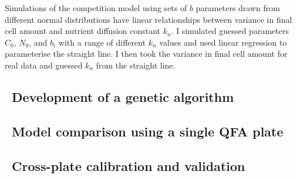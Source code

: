 Simulations of the competition model using sets of \(b\) parameters
drawn from different normal distributions have linear relationships
between variance in final cell amount and nutrient diffusion constant
\(k_{n}\). I simulated guessed parameters \(C_0\), \(N_0\), and
\(b_{i}\) with a range of different \(k_{n}\) values and used linear
regression to parameterise the straight line. I then took the variance
in final cell amount for real data and guessed \(k_{n}\) from the
straight line.

\subsection{\thesubsection~Development of a genetic algorithm}


\subsection{\thesubsection~Model comparison using a single QFA plate}
\subsection{\thesubsection~Cross-plate calibration and validation}

